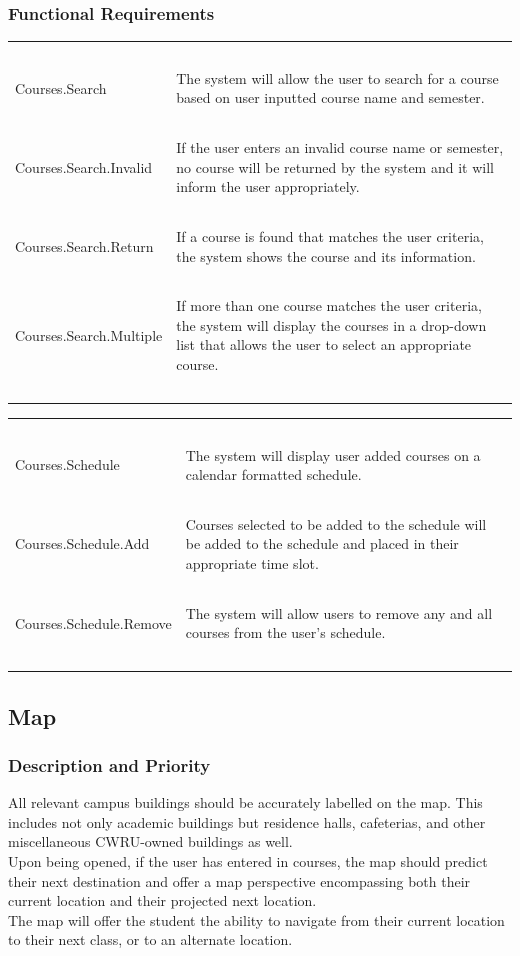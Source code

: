 \documentclass[pdftex,12pt,letter]{article}
\begin{document}
\subsubsection{Functional Requirements}
\begin{table}[!h]
\begin{tabularx}{\textwidth }[t]{|l Y|}
\hline
~&~\\
Courses.Search & The system will allow the user to search for a course based on user inputted course name and semester.\\ 
~&~\\
Courses.Search.Invalid & If the user enters an invalid course name or semester, no course will be returned by the system and it will inform the user appropriately.\\
~&~\\
Courses.Search.Return & If a course is found that matches the user criteria, the system shows the course and its information. \\
~&~\\
Courses.Search.Multiple & If more than one course matches the user criteria, the system will display the courses in a drop-down list that allows the user to select an appropriate course.\\
~&~\\
\hline
\end{tabularx}
\end{table}
\begin{table}[!h]
\begin{tabularx}{\textwidth }[t]{|l Y|}
\hline
~&~\\
Courses.Schedule & The system will display user added courses on a calendar formatted schedule.\\
~&~\\
Courses.Schedule.Add & Courses selected to be added to the schedule will be added to the schedule and placed in their appropriate time slot.\\
~&~\\
Courses.Schedule.Remove & The system will allow users to remove any and all courses from the user's schedule.\\
~&~\\
\hline
\end{tabularx}
\end{table}
\FloatBarrier
\subsection{Map}
\subsubsection{Description and Priority}
All relevant campus buildings should be accurately labelled on the map. This includes not only academic buildings but residence halls, cafeterias, and other miscellaneous CWRU-owned buildings as well.\\
Upon being opened, if the user has entered in courses, the map should predict their next destination and offer a map perspective encompassing both their current location and their projected next location.\\
The map will offer the student the ability to navigate from their current location to their next class, or to an alternate location.
\end{document}
